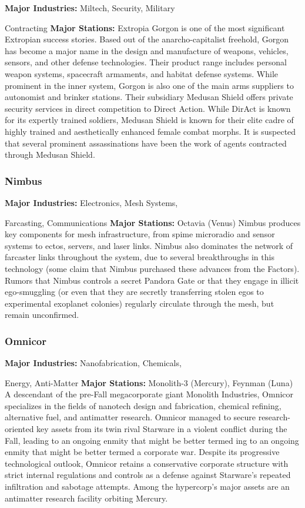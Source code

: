 \textbf{Major Industries:} Miltech, Security, Military 

Contracting
\textbf{Major Stations:} Extropia
Gorgon is one of the most significant  Extropian 
success stories. Based out of the anarcho-capitalist 
freehold, Gorgon has become a major name in the 
design and manufacture of weapons, vehicles, sensors, 
and other defense technologies. Their product range 
includes personal weapon systems, spacecraft armaments, and habitat defense systems. While prominent 
in the inner system, Gorgon is also one of the main 
arms suppliers to autonomist and brinker stations. 
Their subsidiary Medusan Shield offers private security services in direct competition to Direct Action. 
While DirAct is known for its expertly trained soldiers, Medusan Shield is known for their elite cadre 
of highly trained and aesthetically enhanced female 
combat morphs. It is suspected that several prominent assassinations have been the work of agents 
contracted through Medusan Shield.

\subsubsection{Nimbus}

\textbf{Major Industries:} Electronics, Mesh Systems, 

Farcasting, Communications
\textbf{Major Stations:} Octavia (Venus)
Nimbus produces key components for mesh infrastructure, from spime microradio and sensor systems to ectos, servers, and laser links. Nimbus also 
dominates the network of farcaster links throughout 
the system, due to several breakthroughs in this technology (some claim that Nimbus purchased these 
advances from the Factors). Rumors that Nimbus 
controls a secret Pandora Gate or that they engage 
in illicit ego-smuggling (or even that they are secretly 
transferring stolen egos to experimental exoplanet 
colonies) regularly circulate through the mesh, but 
remain unconfirmed.

\subsubsection{Omnicor}

\textbf{Major Industries:} Nanofabrication, Chemicals, 

Energy, Anti-Matter
\textbf{Major Stations:} Monolith-3 (Mercury), Feynman (Luna)
A descendant of the pre-Fall megacorporate giant 
Monolith Industries, Omnicor specializes in the fields 
of nanotech design and fabrication, chemical refining, 
alternative fuel, and antimatter research. Omnicor managed to secure research-oriented key assets from its twin 
rival Starware in a violent conflict during the Fall, leading to an ongoing enmity that might be better termed 
ing to an ongoing enmity that might be better termed
a corporate war. Despite its progressive technological 
outlook, Omnicor retains a conservative corporate 
structure with strict internal regulations and controls 
as a defense against Starware's repeated infiltration and 
sabotage attempts. Among the hypercorp's major assets 
are an antimatter research facility orbiting Mercury.

